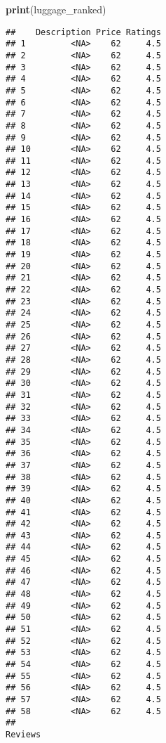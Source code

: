 \documentclass[
]{article}
\newenvironment{Shaded}{\begin{snugshade}}{\end{snugshade}}
\newcommand{\FunctionTok}[1]{\textcolor[rgb]{0.13,0.29,0.53}{\textbf{#1}}}
\newcommand{\NormalTok}[1]{#1}
\begin{document}
\begin{Shaded}
\begin{Highlighting}[]
\FunctionTok{print}\NormalTok{(luggage\_ranked)}
\end{Highlighting}
\end{Shaded}

\begin{verbatim}
##    Description Price Ratings
## 1         <NA>    62     4.5
## 2         <NA>    62     4.5
## 3         <NA>    62     4.5
## 4         <NA>    62     4.5
## 5         <NA>    62     4.5
## 6         <NA>    62     4.5
## 7         <NA>    62     4.5
## 8         <NA>    62     4.5
## 9         <NA>    62     4.5
## 10        <NA>    62     4.5
## 11        <NA>    62     4.5
## 12        <NA>    62     4.5
## 13        <NA>    62     4.5
## 14        <NA>    62     4.5
## 15        <NA>    62     4.5
## 16        <NA>    62     4.5
## 17        <NA>    62     4.5
## 18        <NA>    62     4.5
## 19        <NA>    62     4.5
## 20        <NA>    62     4.5
## 21        <NA>    62     4.5
## 22        <NA>    62     4.5
## 23        <NA>    62     4.5
## 24        <NA>    62     4.5
## 25        <NA>    62     4.5
## 26        <NA>    62     4.5
## 27        <NA>    62     4.5
## 28        <NA>    62     4.5
## 29        <NA>    62     4.5
## 30        <NA>    62     4.5
## 31        <NA>    62     4.5
## 32        <NA>    62     4.5
## 33        <NA>    62     4.5
## 34        <NA>    62     4.5
## 35        <NA>    62     4.5
## 36        <NA>    62     4.5
## 37        <NA>    62     4.5
## 38        <NA>    62     4.5
## 39        <NA>    62     4.5
## 40        <NA>    62     4.5
## 41        <NA>    62     4.5
## 42        <NA>    62     4.5
## 43        <NA>    62     4.5
## 44        <NA>    62     4.5
## 45        <NA>    62     4.5
## 46        <NA>    62     4.5
## 47        <NA>    62     4.5
## 48        <NA>    62     4.5
## 49        <NA>    62     4.5
## 50        <NA>    62     4.5
## 51        <NA>    62     4.5
## 52        <NA>    62     4.5
## 53        <NA>    62     4.5
## 54        <NA>    62     4.5
## 55        <NA>    62     4.5
## 56        <NA>    62     4.5
## 57        <NA>    62     4.5
## 58        <NA>    62     4.5
##                                                                                                                                                                                                                                                                                                                                                                                                                                                                                                                                                                                                                       Reviews

\end{verbatim}
\end{document}
